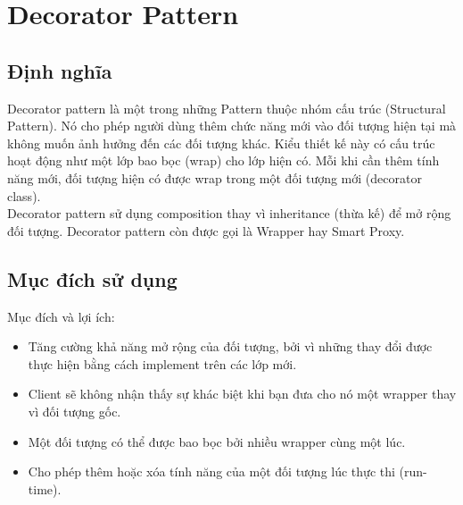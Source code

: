 \chapter{Decorator Pattern}

\section{Định nghĩa}
Decorator pattern là một trong những Pattern thuộc nhóm cấu trúc (Structural Pattern). Nó cho phép người dùng thêm chức năng mới vào đối tượng hiện tại mà không muốn ảnh hưởng đến các đối tượng khác. Kiểu thiết kế này có cấu trúc hoạt động như một lớp bao bọc (wrap) cho lớp hiện có. Mỗi khi cần thêm tính năng mới, đối tượng hiện có được wrap trong một đối tượng mới (decorator class).\\

Decorator pattern sử dụng composition thay vì inheritance (thừa kế) để mở rộng đối tượng. Decorator pattern còn được gọi là Wrapper hay Smart Proxy.

\section{Mục đích sử dụng}
Mục đích và lợi ích:
\begin{itemize}
	\item Tăng cường khả năng mở rộng của đối tượng, bởi vì những thay đổi được thực hiện bằng cách implement trên các lớp mới.
	\item Client sẽ không nhận thấy sự khác biệt khi bạn đưa cho nó một wrapper thay vì đối tượng gốc.
	\item Một đối tượng có thể được bao bọc bởi nhiều wrapper cùng một lúc.
	\item Cho phép thêm hoặc xóa tính năng của một đối tượng lúc thực thi (run-time).
\end{itemize}

